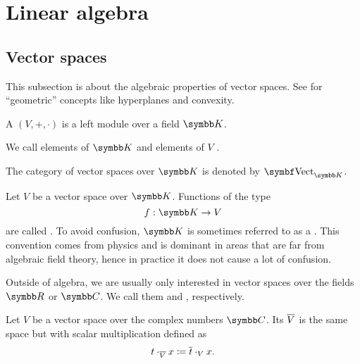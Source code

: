 \section{Linear algebra}\label{sec:linear_algebra}
\subsection{Vector spaces}\label{subsec:vector_spaces}

This subsection is about the algebraic properties of vector spaces. See  for \enquote{geometric} concepts like hyperplanes and convexity.

\begin{definition}\label{def:vector_space}
  A  \( (V, +, \cdot) \) is a left module over a field \( \BK \).

  We call elements of \( \BK \)  and elements of \( V \) .

  The category of vector spaces over \( \BK \) is denoted by \( \Cat{Vect}_{\BK} \).
\end{definition}

\begin{definition}\label{def:vector_field}
  Let \( V \) be a vector space over \( \BK \). Functions of the type
  \begin{equation*}
    f: \BK \to V
  \end{equation*}
  are called . To avoid confusion, \( \BK \) is sometimes referred to as a . This convention comes from physics and is dominant in areas that are far from algebraic field theory, hence in practice it does not cause a lot of confusion.
\end{definition}

\begin{remark}\label{remark:real_vector_space}
  Outside of algebra, we are usually only interested in vector spaces over the fields \( \BR \) or \( \BC \). We call them  and , respectively.
\end{remark}

\begin{definition}\label{def:complex_conjucate_vector_space}
  Let \( V \) be a vector space over the complex numbers \( \BC \). Its  \( \overline{V} \) is the same space but with scalar multiplication defined as
  \begin{equation*}
    t \cdot_{\overline{V}} x \coloneqq \overline{t} \cdot_V x.
  \end{equation*}
\end{definition}

